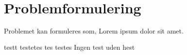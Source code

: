 \section{Problemformulering}
Problemet kan formuleres som, Lorem ipsum dolor sit amet.

testt testetes tes testes
Ingen test uden hest
\cite[p. 215]{lamport94}


\clearpage